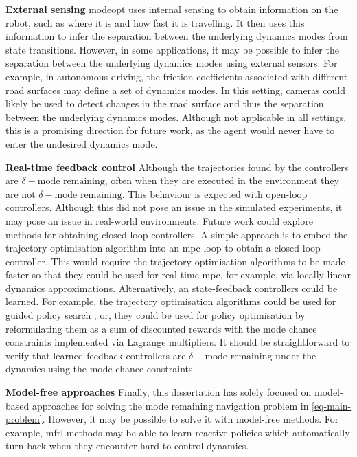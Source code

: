 \documentclass{mimosis-class/mimosis}
\numberwithin{equation}{chapter}
\begin{document}
{\textbf{External sensing}
\acrshort{modeopt} uses internal sensing to obtain information on the robot, such as where it is and how fast it is travelling.
It then uses this information to infer the separation between the underlying dynamics modes from state transitions.
However, in some applications, it may be possible to infer the separation between the underlying dynamics modes
using external sensors.
For example, in autonomous driving, the friction coefficients associated with different road surfaces may
define a set of dynamics modes.
In this setting, cameras could likely be used to detect changes in the road surface and thus
the separation between the underlying dynamics modes.
Although not applicable in all settings,
this is a promising direction for future work, as the agent would never have to enter the undesired dynamics mode.

\textbf{Real-time feedback control}
Although the trajectories found by the controllers are \(\delta-\text{mode remaining}\), often when
they are executed in the environment they are not \(\delta-\text{mode remaining}\).
This behaviour is expected with open-loop controllers.
Although this did not pose an issue in the simulated experiments, it may pose an issue in real-world environments.
Future work could explore methods for obtaining closed-loop controllers.
A simple approach is to embed the trajectory optimisation algorithm into an \acrshort{mpc} loop to obtain a
closed-loop controller.
This would require the trajectory optimisation algorithms to be made faster
so that they could be used for real-time \acrshort{mpc}, for example, via locally linear dynamics approximations.
Alternatively, an state-feedback controllers could be learned.
For example, the trajectory optimisation algorithms could be used for guided policy search \citep{levineGuided2013},
or, they could be used for policy optimisation by reformulating them as a sum of discounted rewards
with the mode chance constraints implemented via Lagrange multipliers.
It should be straightforward to verify that learned feedback controllers are
\(\delta-\text{mode remaining}\) under the dynamics using the mode chance constraints.

\textbf{Model-free approaches}
Finally, this dissertation has solely focused on model-based approaches for solving the
mode remaining navigation problem in \cref{eq-main-problem}.
However, it may be possible to solve it with model-free methods.
For example, \acrfull{mfrl} methods may be able to learn reactive policies
which automatically turn back when they encounter hard to control dynamics.

}
\end{document}
